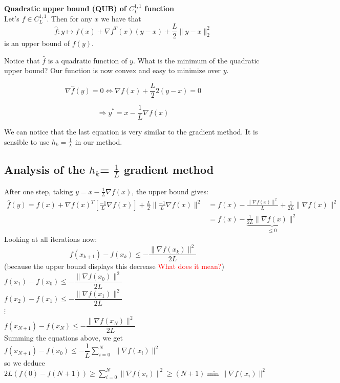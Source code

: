 \begin{lemma}
\textbf{Quadratic upper bound (QUB) of $C_L^{1,1}$ function} \\
Let's $f \in C_L^{1,1}$. Then for any $x$ we have that 
$$ \hat{f}: y \mapsto  f(x)+ \nabla f^T(x)(y-x)+ \frac{L}{2} \| y-x\|^2_2 $$
 is an upper bound of $f(y)$.
\end{lemma}

Notice that $\hat{f}$ is a quadratic function of $y$.  What is the minimum of the quadratic upper bound? Our function is now convex and easy to minimize over $y$.


$$\nabla \hat{f}(y)=0 \Leftrightarrow  \nabla f(x) +\frac{L}{2} 2(y-x)=0$$

$$ \Rightarrow y^{*} = x- \frac{1}{L} \nabla f(x)$$

We can notice that the last equation is very similar to the gradient method. It is sensible to use $h_k=\frac{1}{L}$ in our method. 

\subsection{Analysis of the $h_{k}$= $\frac{1}{L}$ gradient method}
 
After one step, taking  $y= x-\frac{1}{L}\nabla f(x)$, the upper bound gives:
\begin{align*}
\hat{f}(y)=f(x) + \nabla f(x)^{T} [\frac{-1}{L} \nabla f(x)]+\frac{L}{2} \|  \frac{-1}{L}\nabla f(x)\|^2
& =f(x)- \frac{\|\nabla f(x)\|^{2}}{L}+\frac{1}{2L} \|\nabla f(x)\|^{2} \\
& =f(x)-\underbrace{\frac{1}{2L} \|\nabla f(x)\|^{2}}_{\leq 0}
\end{align*}
Looking at all iterations now:
$$ f(x_{k+1})-f(x_{k}) \leq - \frac{\|\nabla f(x_k)\|^{2}}{2L}$$
(because the upper bound displays this decrease \textcolor{red}{What does it mean?})\\


$f(x_1)-f(x_0) \leq -\dfrac{\|\nabla f(x_{0})\|^{2}}{2L}$\\
$f(x_2)-f(x_1) \leq -\dfrac{\|\nabla f(x_{1})\|^{2}}{2L}$ \\
$\vdots$ \\
$f(x_{N+1})-f(x_N) \leq -\dfrac{\|\nabla f(x_{N})\|^{2}}{2L}$\\

Summing the equations above, we get \\
$f(x_{N+1})-f(x_0) \leq - \dfrac{1}{L} \sum\limits_{i=0}^{N}$ $\|\nabla f(x_{i})\|^{2}$\\
so we deduce \\
$2L(f(0)-f(N+1)) \geq \sum\limits_{i=0}^{N} \|\nabla f(x_{i})\|^{2} \geq (N+1) \min \|\nabla f(x_{i})\|^{2}$

